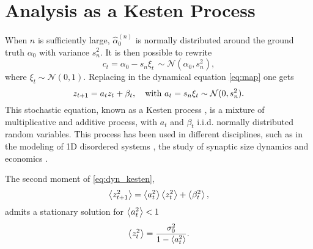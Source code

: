 \documentclass[FinalReport.tex]{subfiles}
\begin{document}
\section{Analysis as a Kesten Process}
When $n$ is sufficiently large, $\hat{\alpha}_0^{(n)}$ is normally distributed around the ground truth $\alpha_0$ with variance $s_n^2$. It is then possible to rewrite
\begin{equation}
	c_t = \alpha_0-s_n\xi_t\,\sim\mathcal{N}(\alpha_0,s_n^2),	
\end{equation}
where $\xi_t\sim\mathcal{N}(0,1)$. Replacing in the dynamical equation \eqref{eq:map} one gets
\begin{equation}\label{eq:dyn_kesten}
	z_{t+1}=a_t z_t+\beta_t, \quad \text{with } a_t=s_n\xi_t	\sim\mathcal{N}(0,s_n^2).
\end{equation}
This stochastic equation, known as a Kesten process \cite{kesten}, is a mixture of multiplicative and additive process, with $a_t$ and $\beta_t$ i.i.d. normally distributed random variables. This process has been used in different disciplines, such as in the modeling of 1D disordered systems \cite{kesten-process-physics}, the study of synaptic size dynamics \cite{kesten-process-synapse-2,kesten-synapses} and economics \cite{kesten-econ}.

The second moment of \eqref{eq:dyn_kesten},
\begin{equation}
	\expval{z_{t+1}^2}=\expval{a_t^2}\expval{z_t^2}+\expval{\beta_t^2},	
\end{equation}
admits a stationary solution for $\expval{a_t^2}<1$
\begin{equation}\label{eq:cond_stat_sol}	
	\expval{z_t^2}=\frac{\sigma_0^2}{1-\expval{a_t^2}}.	
\end{equation}
\end{document}
